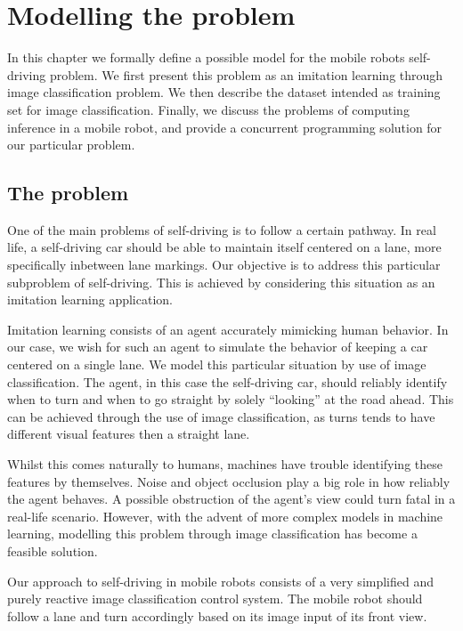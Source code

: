 
\chapter{Modelling the problem}\label{chp:modelling}

In this chapter we formally define a possible model for the mobile robots self-driving problem.  We
first present this problem as an imitation learning through image classification problem. We then
describe the dataset intended as training set for image classification. Finally, we discuss the
problems of computing inference in a mobile robot, and provide a concurrent programming solution
for our particular problem.

\section{The problem}

One of the main problems of self-driving is to follow a certain pathway. In real life, a
self-driving car should be able to maintain itself centered on a lane, more specifically inbetween
lane markings. Our objective is to address this particular subproblem of self-driving. This is
achieved by considering this situation as an imitation learning application.

Imitation learning consists of an agent accurately mimicking human behavior. In our case, we wish
for such an agent to simulate the behavior of keeping a car centered on a single lane. We model
this particular situation by use of image classification. The agent, in this case the self-driving
car, should reliably identify when to turn and when to go straight by solely ``looking'' at the
road ahead. This can be achieved through the use of image classification, as turns tends to have
different visual features then a straight lane.

Whilst this comes naturally to humans, machines have trouble identifying these features by
themselves.  Noise and object occlusion play a big role in how reliably the agent behaves. A
possible obstruction of the agent's view could turn fatal in a real-life scenario. However, with
the advent of more complex models in machine learning, modelling this problem through image
classification has become a feasible solution.

Our approach to self-driving in mobile robots consists of a very simplified and purely reactive
image classification control system. The mobile robot should follow a lane and turn accordingly
based on its image input of its front view.

